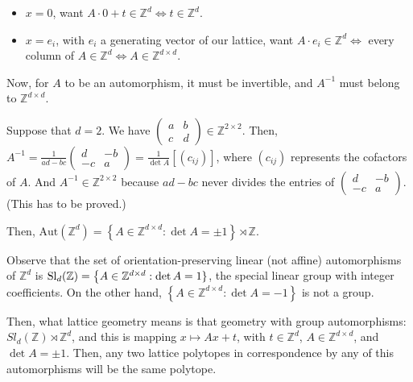 \begin{itemize}
\item $x = 0$, want $A \cdot 0 + t \in \mathbb{Z}^{d}
  \Longleftrightarrow t \in \mathbb{Z}^{d}$.

\item $x = e_{i}$, with $e_{i}$ a generating vector of our lattice,
  want $A \cdot e_{i} \in \mathbb{Z}^{d} \Longleftrightarrow$ every
  column of $A \in \mathbb{Z}^{d} \Longleftrightarrow A \in
  \mathbb{Z}^{d \times d}$.
\end{itemize}

Now, for $A$ to be an automorphism, it must be invertible, and
$A^{-1}$ must belong to $\mathbb{Z}^{d \times d}$.

\begin{example} Suppose that $d = 2$. We have
  $\left( \begin{smallmatrix} a & b \\ c & d \end{smallmatrix} \right)
  \in \mathbb{Z}^{2 \times 2}$. Then, $A^{-1} = \frac{1}{ad - bc}
  \left( \begin{smallmatrix} d & -b \\ -c & a \end{smallmatrix} \right) =
  \frac{1}{\det A}\left[ (c_{ij}) \right]$, where $(c_{ij})$
  represents the cofactors of $A$. And $A^{-1} \in \mathbb{Z}^{2
    \times 2}$ because $ad - bc$ never divides the entries of
  $\left( \begin{smallmatrix} d & - b \\ - c & a \end{smallmatrix}
  \right)$. (This has to be proved.)
\end{example}

Then, $\text{Aut}(\mathbb{Z}^{d}) = \left\lbrace A \in \mathbb{Z}^{d
    \times d} : \det A = \pm 1 \right\rbrace \rtimes \mathbb{Z}$.

Observe that the set of orientation-preserving linear (not affine)
automorphisms of $\mathbb{Z}^{d}$ is $\operatorname{Sl}_d(\mathbb{Z}) = \big\{ A \in
\mathbb{Z}^{d \times d} : \det A = 1 \}$, the special linear group
with integer coefficients. On the other hand, $\left\lbrace A \in
  \mathbb{Z}^{d \times d} : \det A = -1 \right\rbrace$ is not a group.

  Then, what lattice geometry means is that geometry with group
  automorphisms: $Sl_{d}(\mathbb{Z}) \rtimes \mathbb{Z}^{d}$, and this
  is mapping $x \longmapsto Ax + t$, with $t \in \mathbb{Z}^{d}$, $A
  \in \mathbb{Z}^{d \times d}$, and $\det A = \pm 1$. Then, any two
  lattice polytopes in correspondence by any of this automorphisms
  will be the same polytope.

